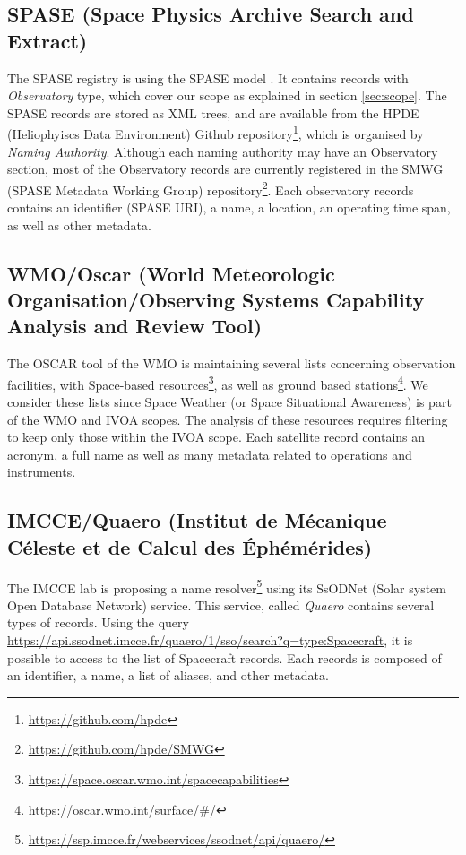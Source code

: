 \documentclass[11pt,a4paper]{ivoa}
\begin{document}
\subsection{SPASE (Space Physics Archive Search and Extract)} 
The SPASE registry is using the SPASE model \citep{Roberts:2018bi}. 
It contains records with \emph{Observatory} type, which cover our
scope as explained in section \ref{sec:scope}. The SPASE records 
are stored as XML trees, and are available from the HPDE (Heliophyiscs
Data Environment) Github repository\footnote{\url{https://github.com/hpde}},
which is organised by \emph{Naming Authority}. Although each naming 
authority may have an Observatory section, most of the Observatory 
records are currently registered in the SMWG (SPASE Metadata Working
Group) repository\footnote{\url{https://github.com/hpde/SMWG}}.
Each observatory records contains an identifier (SPASE URI), a name, 
a location, an operating time span, as well as other metadata. 


\subsection{WMO/Oscar (World Meteorologic Organisation/Observing Systems Capability Analysis and Review Tool)}
The OSCAR tool of the WMO is maintaining several lists concerning
observation facilities, with Space-based resources\footnote{\url{https://space.oscar.wmo.int/spacecapabilities}}, 
as well as ground based stations\footnote{\url{https://oscar.wmo.int/surface/\#/}}. 
We consider these lists since Space Weather (or Space Situational 
Awareness) is part of the WMO and IVOA scopes. The analysis of these 
resources requires filtering to keep only those within the IVOA scope.  
Each satellite record contains an acronym, a full name as well as many 
metadata related to operations and instruments.  

\subsection{IMCCE/Quaero (Institut de M\'ecanique C\'eleste et de Calcul des \'Eph\'em\'erides)}
The IMCCE lab is proposing a name resolver\footnote{\url{https://ssp.imcce.fr/webservices/ssodnet/api/quaero/}} 
using its SsODNet (Solar system Open Database Network) service. This
service, called \emph{Quaero} contains several types of records. Using 
the query \url{https://api.ssodnet.imcce.fr/quaero/1/sso/search?q=type:Spacecraft}, 
it is possible to access to the list of Spacecraft records. Each 
records is composed of an identifier, a name, a list of
aliases, and other metadata.
\end{document}
